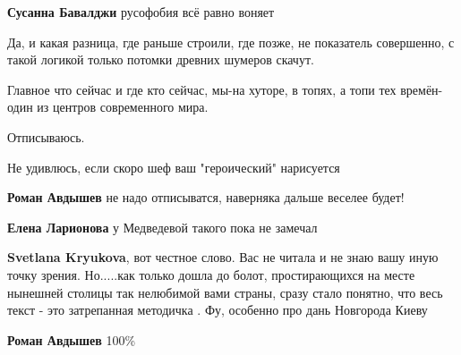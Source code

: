 \begin{itemize}
\begin{itemize}
\textbf{Сусанна Бавалджи} русофобия всё равно воняет

 

Да, и какая разница, где раньше строили, где позже, не показатель совершенно, с
такой логикой только потомки древних шумеров скачут.

Главное что сейчас и где кто сейчас, мы-на хуторе, в топях, а топи тех времён-один
из центров современного мира.

Отписываюсь.

Не удивлюсь, если скоро шеф ваш "героический" нарисуется

 
\textbf{Роман Авдышев} не надо отписыватся, наверняка дальше веселее будет!

 
\textbf{Елена Ларионова} у Медведевой такого пока не замечал

 
\textbf{Svetlana Kryukova}, вот честное слово. Вас не читала и не знаю вашу иную точку зрения. Но.....как только дошла до болот, простирающихся на месте нынешней столицы так нелюбимой вами страны, сразу стало понятно, что весь текст - это затрепанная методичка . Фу, особенно про дань Новгорода Киеву

 
\textbf{Роман Авдышев} 100\%

 

\end{itemize}
\end{itemize}
